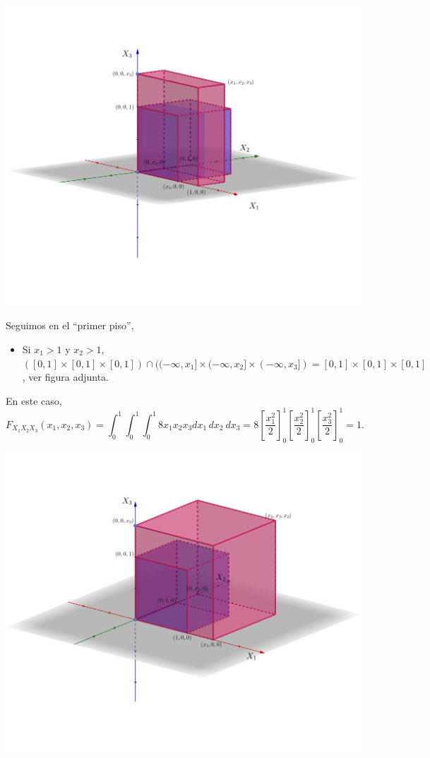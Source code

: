 \documentclass[]{book}
\providecommand{\tightlist}{%
  \setlength{\itemsep}{0pt}\setlength{\parskip}{0pt}}
\begin{document}
\includegraphics{Images/Fx1x2x3pisox1.png}

Seguimos en el ``primer piso'',

\begin{itemize}
\tightlist
\item
  Si \(x_1>1\) y \(x_2>1\), \(([0,1]\times [0,1]\times [0,1])\cap ((-\infty,x_1]\times (-\infty,x_2]\times (-\infty,x_3])=[0,1]\times [0,1]\times [0,1]\), ver figura adjunta.
\end{itemize}

En este caso,
\[
F_{X_1X_2X_3}(x_1,x_2,x_3)=\int_{0}^{1}\int_{0}^{1}\int_{0}^{1} 8 x_1 x_2 x_3 dx_1\, dx_2\ dx_3 = 
8\left[\frac{x_1^2}{2}\right]_0^{1}\left[\frac{x_2^2}{2}\right]_0^{1}\left[\frac{x_3^2}{2}\right]_0^{1} = 1.
\]

\includegraphics{Images/Fx1x2x3pisox1x2.png}
\end{document}
